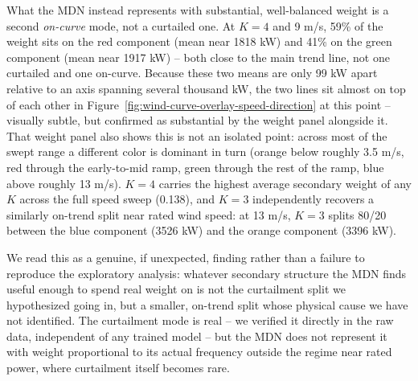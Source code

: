 What the MDN instead represents with substantial, well-balanced weight is a second \emph{on-curve} mode, not a curtailed one.
At $K=4$ and 9 m/s, 59\% of the weight sits on the red component (mean near 1818 kW) and 41\% on the green component (mean near 1917 kW) -- both close to the main trend line, not one curtailed and one on-curve.
Because these two means are only 99 kW apart relative to an axis spanning several thousand kW, the two lines sit almost on top of each other in Figure~\ref{fig:wind-curve-overlay-speed-direction} at this point -- visually subtle, but confirmed as substantial by the weight panel alongside it.
That weight panel also shows this is not an isolated point: across most of the swept range a different color is dominant in turn (orange below roughly 3.5 m/s, red through the early-to-mid ramp, green through the rest of the ramp, blue above roughly 13 m/s).
$K=4$ carries the highest average secondary weight of any $K$ across the full speed sweep (0.138), and $K=3$ independently recovers a similarly on-trend split near rated wind speed: at 13 m/s, $K=3$ splits 80/20 between the blue component (3526 kW) and the orange component (3396 kW).

We read this as a genuine, if unexpected, finding rather than a failure to reproduce the exploratory analysis: whatever secondary structure the MDN finds useful enough to spend real weight on is not the curtailment split we hypothesized going in, but a smaller, on-trend split whose physical cause we have not identified.
The curtailment mode is real -- we verified it directly in the raw data, independent of any trained model -- but the MDN does not represent it with weight proportional to its actual frequency outside the regime near rated power, where curtailment itself becomes rare.

